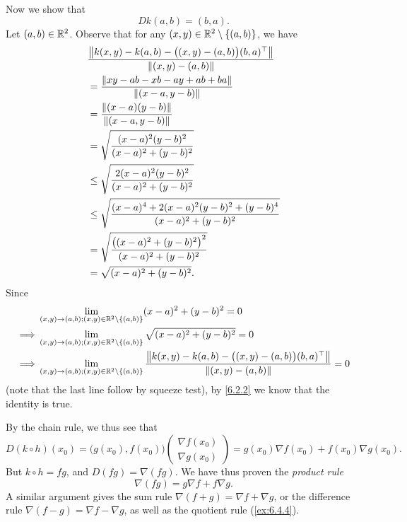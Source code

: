 \begin{eg}
  Now we show that
  \[
    D k(a, b) = (b, a).
  \]
  Let \((a, b) \in \R^2\).
  Observe that for any \((x, y) \in \R^2 \setminus \{(a, b)\}\), we have
  \begin{align*}
     & \dfrac{\norm*{k(x, y) - k(a, b) - \big((x, y) - (a, b)\big) (b, a)^\top}}{\norm*{(x, y) - (a, b)}} \\
     & = \dfrac{\norm*{xy - ab - xb - ay + ab + ba}}{\norm*{(x - a, y - b)}}                              \\
     & = \dfrac{\norm*{(x - a)(y - b)}}{\norm*{(x - a, y - b)}}                                           \\
     & = \sqrt{\dfrac{(x - a)^2 (y - b)^2}{(x - a)^2 + (y - b)^2}}                                        \\
     & \leq \sqrt{\dfrac{2 (x - a)^2 (y - b)^2}{(x - a)^2 + (y - b)^2}}                                   \\
     & \leq \sqrt{\dfrac{(x - a)^4 + 2 (x - a)^2 (y - b)^2 + (y - b)^4}{(x - a)^2 + (y - b)^2}}           \\
     & = \sqrt{\dfrac{\big((x - a)^2 + (y - b)^2\big)^2}{(x - a)^2 + (y - b)^2}}                          \\
     & = \sqrt{(x - a)^2 + (y - b)^2}.
  \end{align*}
  Since
  \begin{align*}
             & \lim_{(x, y) \to (a, b) ; (x, y) \in \R^2 \setminus \{(a, b)\}} (x - a)^2 + (y - b)^2 = 0                                                                              \\
    \implies & \lim_{(x, y) \to (a, b) ; (x, y) \in \R^2 \setminus \{(a, b)\}} \sqrt{(x - a)^2 + (y - b)^2} = 0                                                                       \\
    \implies & \lim_{(x, y) \to (a, b) ; (x, y) \in \R^2 \setminus \{(a, b)\}} \dfrac{\norm*{k(x, y) - k(a, b) - \big((x, y) - (a, b)\big) (b, a)^\top}}{\norm*{(x, y) - (a, b)}} = 0
  \end{align*}
  (note that the last line follow by squeeze test),
  by \cref{6.2.2} we know that the identity is true.

  By the chain rule, we thus see that
  \[
    D (k \circ h)(x_0) = \big(g(x_0), f(x_0)\big) \begin{pmatrix}
      \nabla f(x_0) \\
      \nabla g(x_0)
    \end{pmatrix} = g(x_0) \nabla f(x_0) + f(x_0) \nabla g(x_0).
  \]
  But \(k \circ h = fg\), and \(D (fg) = \nabla (fg)\).
  We have thus proven the \emph{product rule}
  \[
    \nabla (fg) = g \nabla f + f \nabla g.
  \]
  A similar argument gives the sum rule \(\nabla (f + g) = \nabla f + \nabla g\), or the difference rule \(\nabla (f - g) = \nabla f - \nabla g\), as well as the quotient rule (\cref{ex:6.4.4}).
\end{eg}

